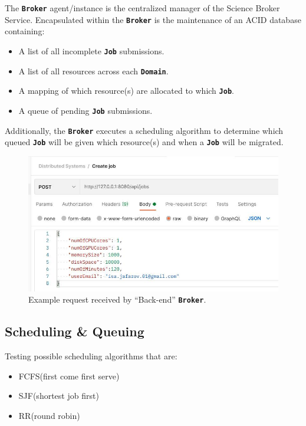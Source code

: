 \documentclass{ReportCUNY}
\newcommand{\KeyWord}[1]{\textbf{\texttt{#1}}}
\begin{document}
The \KeyWord{Broker} agent/instance is the centralized manager of the Science Broker Service.
Encapsulated within the \KeyWord{Broker} is the maintenance of an ACID database containing:
\begin{itemize}
\item A list of all incomplete \KeyWord{Job} submissions.
\item A list of all resources across each \KeyWord{Domain}.
\item A mapping of which resource(s) are allocated to which \KeyWord{Job}.
\item A queue of pending \KeyWord{Job} submissions.
\end{itemize}

Additionally, the \KeyWord{Broker} executes a scheduling algorithm to determine which queued \KeyWord{Job} will be given which resource(s) and when a \KeyWord{Job} will be migrated.

\begin{figure}
	\includegraphics[width=\textwidth]{Backend-API-Demo.jpeg}
	\caption{Example request received by ``Back-end''  \KeyWord{Broker}.}
\end{figure}




\subsection{Scheduling \& Queuing}

Testing possible scheduling algorithms that are:
\begin{itemize}
\item FCFS(first come first serve)
\item SJF(shortest job first)
\item RR(round robin)
\end{itemize}
\end{document}
